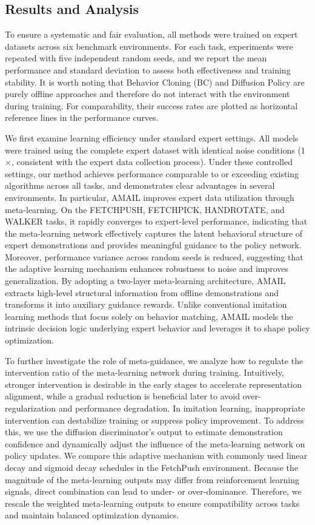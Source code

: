 \documentclass[lettersize,journal]{IEEEtran}
\begin{document}
\subsection{Results and Analysis}
To ensure a systematic and fair evaluation, all methods were trained on expert datasets across six benchmark environments. For each task, experiments were repeated with five independent random seeds, and we report the mean performance and standard deviation to assess both effectiveness and training stability. It is worth noting that Behavior Cloning (BC) and Diffusion Policy are purely offline approaches and therefore do not interact with the environment during training. For comparability, their success rates are plotted as horizontal reference lines in the performance curves.

We first examine learning efficiency under standard expert settings. All models were trained using the complete expert dataset with identical noise conditions (1$\times$, consistent with the expert data collection process). Under these controlled settings, our method achieves performance comparable to or exceeding existing algorithms across all tasks, and demonstrates clear advantages in several environments. In particular, AMAIL improves expert data utilization through meta-learning. On the FETCHPUSH, FETCHPICK, HANDROTATE, and WALKER tasks, it rapidly converges to expert-level performance, indicating that the meta-learning network effectively captures the latent behavioral structure of expert demonstrations and provides meaningful guidance to the policy network. Moreover, performance variance across random seeds is reduced, suggesting that the adaptive learning mechanism enhances robustness to noise and improves generalization. By adopting a two-layer meta-learning architecture, AMAIL extracts high-level structural information from offline demonstrations and transforms it into auxiliary guidance rewards. Unlike conventional imitation learning methods that focus solely on behavior matching, AMAIL models the intrinsic decision logic underlying expert behavior and leverages it to shape policy optimization.

To further investigate the role of meta-guidance, we analyze how to regulate the intervention ratio of the meta-learning network during training. Intuitively, stronger intervention is desirable in the early stages to accelerate representation alignment, while a gradual reduction is beneficial later to avoid over-regularization and performance degradation. In imitation learning, inappropriate intervention can destabilize training or suppress policy improvement. To address this, we use the diffusion discriminator's output to estimate demonstration confidence and dynamically adjust the influence of the meta-learning network on policy updates. We compare this adaptive mechanism with commonly used linear decay and sigmoid decay schedules in the FetchPush environment. Because the magnitude of the meta-learning outputs may differ from reinforcement learning signals, direct combination can lead to under- or over-dominance. Therefore, we rescale the weighted meta-learning outputs to ensure compatibility across tasks and maintain balanced optimization dynamics.
\end{document}
